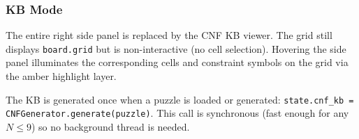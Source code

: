 \subsubsection{KB Mode}

The entire right side panel is replaced by the CNF KB viewer.
The grid still displays \texttt{board.grid} but is non-interactive (no cell
selection).
Hovering the side panel illuminates the corresponding cells and constraint
symbols on the grid via the amber highlight layer.

The KB is generated once when a puzzle is loaded or generated:
\texttt{state.cnf\_kb = CNFGenerator.generate(puzzle)}.
This call is synchronous (fast enough for any $N \le 9$) so no background
thread is needed.